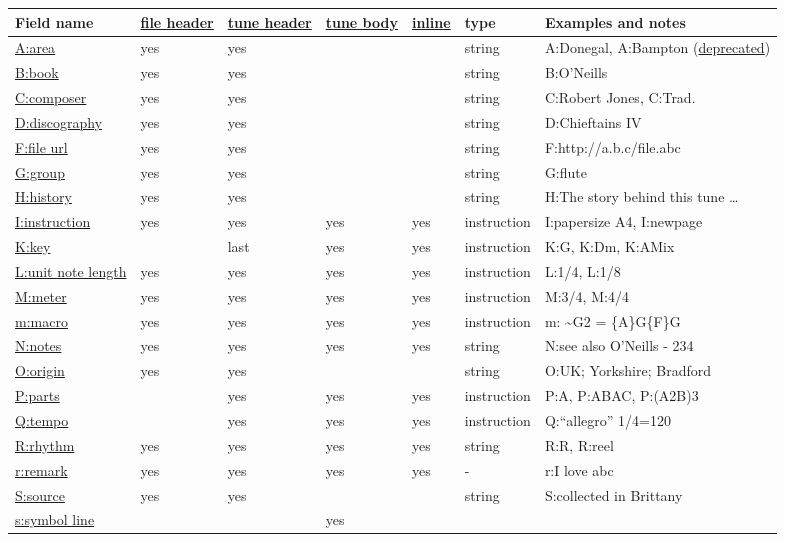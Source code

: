\begin{longtable}[]{@{}lllllll@{}}
\toprule
Field name & \protect\hyperlink{file_header_definition}{file header} &
\protect\hyperlink{tune_header_definition}{tune header} &
\protect\hyperlink{tune_body_definition}{tune body} &
\protect\hyperlink{inline_field_definition}{inline} & type & Examples
and notes\tabularnewline
\midrule
\endhead
\protect\hyperlink{aarea}{A:area} & yes & yes & & & string & A:Donegal,
A:Bampton
(\protect\hyperlink{outdated_information_field_syntax}{deprecated})\tabularnewline
\protect\hyperlink{bdfsbackground_information}{B:book} & yes & yes & & &
string & B:O'Neills\tabularnewline
\protect\hyperlink{ccomposer}{C:composer} & yes & yes & & & string &
C:Robert Jones, C:Trad.\tabularnewline
\protect\hyperlink{bdfsbackground_information}{D:discography} & yes &
yes & & & string & D:Chieftains IV\tabularnewline
\protect\hyperlink{bdfsbackground_information}{F:file url} & yes & yes &
& & string & F:http://a.b.c/file.abc\tabularnewline
\protect\hyperlink{ggroup}{G:group} & yes & yes & & & string &
G:flute\tabularnewline
\protect\hyperlink{hhistory}{H:history} & yes & yes & & & string & H:The
story behind this tune \ldots{}\tabularnewline
\protect\hyperlink{iinstruction}{I:instruction} & yes & yes & yes & yes
& instruction & I:papersize A4, I:newpage\tabularnewline
\protect\hyperlink{kkey}{K:key} & & last & yes & yes & instruction &
K:G, K:Dm, K:AMix\tabularnewline
\protect\hyperlink{lunit_note_length}{L:unit note length} & yes & yes &
yes & yes & instruction & L:1/4, L:1/8\tabularnewline
\protect\hyperlink{mmeter}{M:meter} & yes & yes & yes & yes &
instruction & M:3/4, M:4/4\tabularnewline
\protect\hyperlink{macros}{m:macro} & yes & yes & yes & yes &
instruction & m: \textasciitilde{}G2 = \{A\}G\{F\}G\tabularnewline
\protect\hyperlink{nnotes}{N:notes} & yes & yes & yes & yes & string &
N:see also O'Neills - 234\tabularnewline
\protect\hyperlink{oorigin}{O:origin} & yes & yes & & & string & O:UK;
Yorkshire; Bradford\tabularnewline
\protect\hyperlink{pparts}{P:parts} & & yes & yes & yes & instruction &
P:A, P:ABAC, P:(A2B)3\tabularnewline
\protect\hyperlink{qtempo}{Q:tempo} & & yes & yes & yes & instruction &
Q:``allegro'' 1/4=120\tabularnewline
\protect\hyperlink{rrhythm}{R:rhythm} & yes & yes & yes & yes & string &
R:R, R:reel\tabularnewline
\protect\hyperlink{comments_and_remarks}{r:remark} & yes & yes & yes &
yes & - & r:I love abc\tabularnewline
\protect\hyperlink{bdfsbackground_information}{S:source} & yes & yes & &
& string & S:collected in Brittany\tabularnewline
\protect\hyperlink{symbol_lines}{s:symbol line} & & & yes & &

\end{longtable}
